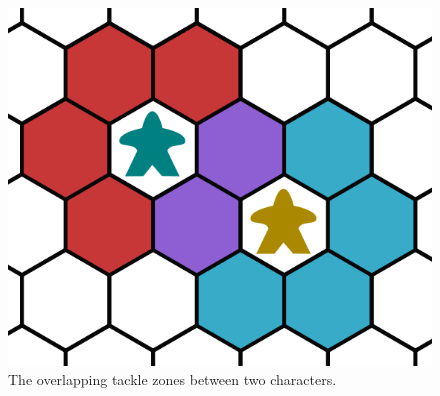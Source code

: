 \begin{figure}
    \centering
    \includegraphics{tackle-zones-2.png}
    \caption{The overlapping tackle zones between two characters.}
    \label{fig:tackle-zone-2}
\end{figure}